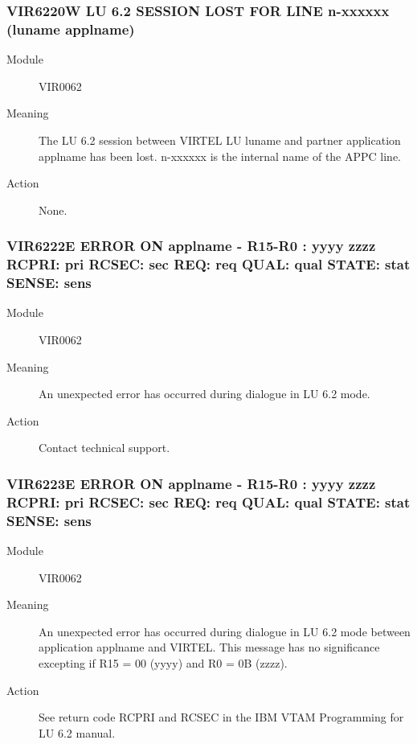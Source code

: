 \documentclass[letterpaper,10pt,english]{sphinxmanual}
\begin{document}
\subsubsection{VIR6220W LU 6.2 SESSION LOST FOR LINE n-xxxxxx (luname \textendash{} applname)}
\label{\detokenize{messages:vir6220w-lu-6-2-session-lost-for-line-n-xxxxxx-luname-applname}}\begin{description}
\item[{Module}] \leavevmode
VIR0062

\item[{Meaning}] \leavevmode
The LU 6.2 session between VIRTEL LU luname and partner application applname has been lost. n-xxxxxx is the internal name of the APPC line.

\item[{Action}] \leavevmode
None.

\end{description}


\subsubsection{VIR6222E ERROR ON applname - R15-R0 : yyyy zzzz RCPRI: pri RCSEC: sec REQ: req QUAL: qual STATE: stat SENSE: sens}
\label{\detokenize{messages:vir6222e-error-on-applname-r15-r0-yyyy-zzzz-rcpri-pri-rcsec-sec-req-req-qual-qual-state-stat-sense-sens}}\begin{description}
\item[{Module}] \leavevmode
VIR0062

\item[{Meaning}] \leavevmode
An unexpected error has occurred during dialogue in LU 6.2 mode.

\item[{Action}] \leavevmode
Contact technical support.

\end{description}


\subsubsection{VIR6223E ERROR ON applname - R15-R0 : yyyy zzzz RCPRI: pri RCSEC: sec REQ: req QUAL: qual STATE: stat SENSE: sens}
\label{\detokenize{messages:vir6223e-error-on-applname-r15-r0-yyyy-zzzz-rcpri-pri-rcsec-sec-req-req-qual-qual-state-stat-sense-sens}}\begin{description}
\item[{Module}] \leavevmode
VIR0062

\item[{Meaning}] \leavevmode
An unexpected error has occurred during dialogue in LU 6.2 mode between application applname and VIRTEL. This message has no significance excepting if R15 = 00 (yyyy) and R0 = 0B (zzzz).

\item[{Action}] \leavevmode
See return code RCPRI and RCSEC in the IBM VTAM Programming for LU 6.2 manual.

\end{description}
\end{document}
